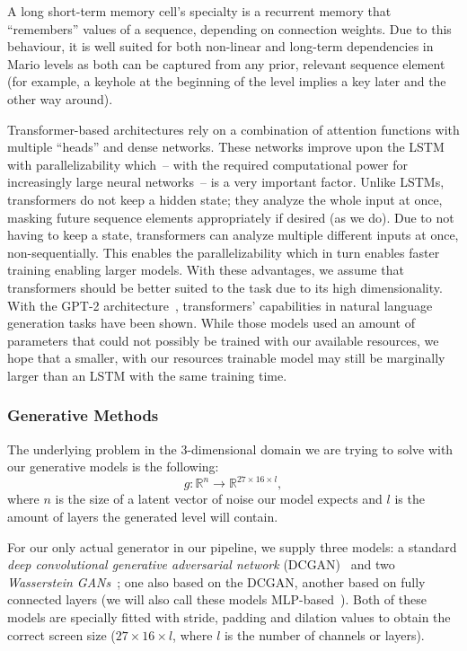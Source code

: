 A long short-term memory cell's specialty is a recurrent memory that
``remembers'' values of a sequence, depending on connection weights.
Due to this behaviour, it is well suited for both non-linear and
long-term dependencies in Mario levels as both can be captured from
any prior, relevant sequence element (for example, a keyhole at the
beginning of the level implies a key later and the other way around).

Transformer-based architectures rely on a combination of attention
functions with multiple ``heads'' and dense networks. These networks
improve upon the LSTM with parallelizability which~-- with the required
computational power for increasingly large neural networks~-- is a very
important factor. Unlike LSTMs, transformers do not keep a hidden
state; they analyze the whole input at once, masking future sequence
elements appropriately if desired (as we do). Due to not having to
keep a state, transformers can analyze multiple different inputs at
once, non-sequentially. This enables the parallelizability which in
turn enables faster training enabling larger models. With these
advantages, we assume that transformers should be better suited to the
task due to its high dimensionality. With the \mbox{GPT-2}
architecture~\cite{radfordLanguageModelsAre}, transformers'
capabilities in natural language generation tasks have been shown.
While those models used an amount of parameters that could not
possibly be trained with our available resources, we hope that a
smaller, with our resources trainable model may still be marginally
larger than an LSTM with the same training time.

\subsubsection{Generative Methods}

The underlying problem in the 3-dimensional domain we are trying to
solve with our generative models is the following:
\begin{equation*}
  g: \mathbb{R}^{n} \to \mathbb{R}^{27 \times 16 \times l},
\end{equation*}
where $n$ is the size of a latent vector of noise our model expects
and $l$ is the amount of layers the generated level will contain.

For our only actual generator in our pipeline, we supply three models:
a standard \emph{deep convolutional generative adversarial network}
(DCGAN)~\cite{radfordUnsupervisedRepresentationLearning2016} and two
\emph{Wasserstein
  GANs}~\cite{arjovskyWassersteinGAN2017,martinarjovskyMartinarjovskyWassersteinGAN2019};
one also based on the DCGAN, another based on fully connected layers
(we will also call these models
MLP-based~\cite{MultilayerPerceptron2019}). Both of these models are
specially fitted with stride, padding and dilation values to obtain
the correct screen size ($27 \times 16 \times l$, where $l$ is the number of
channels or layers).

